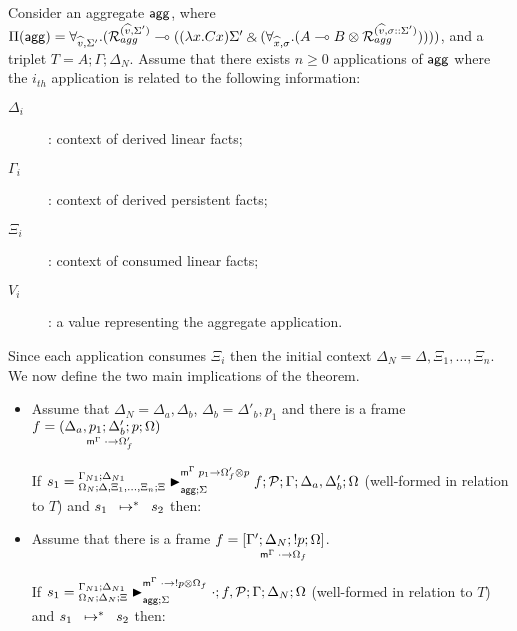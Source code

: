 \begin{theorem}\label{thm:multiple_aggregate_derivation}
Consider an aggregate $\m{agg}$, where $\Pi(\m{agg}) = \forall_{\widehat{v}, \Sigma'}.
   (\defstwo{agg}{\widehat{v}}{\Sigma'} \lolli ((\lambda x. C x)\Sigma' \with (\forall_{\widehat{x}, \sigma}.
                                                (A \lolli B \otimes
                                                 \defstwo{agg}{\widehat{v}}{\sigma
                                                 ::\Sigma'}))))$,
and a triplet $T = A; \Gamma; \Delta_{N}$.
Assume that there exists $n \geq 0$ applications of $\m{agg}$
where the $i_{th}$ application is related to the following information:
\begin{description}
   \item[$\Delta_i$]: context of derived linear facts;
   \item[$\Gamma_i$]: context of derived persistent facts;
   \item[$\Xi_i$]: context of consumed linear facts;
   \item[$V_i$]: a value representing the aggregate application.
\end{description}

Since each application consumes $\Xi_i$ then the initial context $\Delta_N =
\Delta, \Xi_1, \dotsc, \Xi_n$. We now define the two main implications of the
theorem.

\begin{itemize}[leftmargin=*]
   \item Assume that $\Delta_N = \Delta_a, \Delta_b$, $\Delta_b =
   \Delta'_b, p_1$ and there is a frame $f = \lframe{\Delta_a,
      p_1}{\Delta'_b}{p}{\Omega}{\cdot}{\Omega'_f}$

   If $s_1 = \matstatea{\Delta, \Xi_1, \dotsc, \Xi_n}{f; \lstack{P}}{\Gamma}{\Delta_a,
      \Delta'_b}{\Omega}{p_1 \rightarrow \Omega'_f \otimes p}{\Sigma}$
      (well-formed in relation to $T$) and $\transs{s_1}{s_2}$ then:

   

   \item Assume that there is a frame $f = \pframe{\Gamma'}{\Delta_N}{\bang
      p}{\Omega}{\cdot}{\Omega_f}$.
      
   If $s_1 = \matstatea{\Delta_N}{\cdot;
      f, \lstack{P}}{\Gamma}{\Delta_N}{\Omega}{\cdot \rightarrow \bang p \otimes \Omega_f}{\Sigma}$
      (well-formed in relation to $T$) and $\transs{s_1}{s_2}$ then:

   
\end{itemize}
   
\end{theorem}
